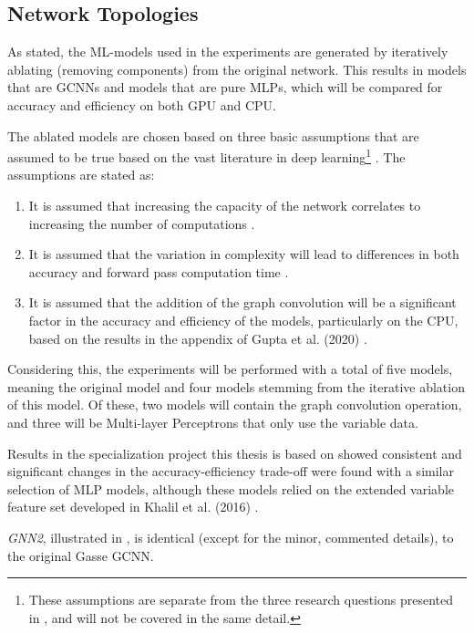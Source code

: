\subsection{Network Topologies}

As stated, the \gls{ML}-models used in the experiments are generated by iteratively ablating (removing components) from the original network. This results in models that are \gls{GCNN}s and models that are pure \gls{MLP}s, which will be compared for accuracy and efficiency on both \gls{GPU} and \gls{CPU}. 

The ablated models are chosen based on three basic assumptions that are assumed to be true based on the vast literature in deep learning\footnote{These assumptions are separate from the three research questions presented in , and will not be covered in the same detail.} \cite{goodfellow2016deep}. The assumptions are stated as: 


\begin{enumerate}[label=(\roman*)]
    \item  It is assumed that increasing the capacity of the network correlates to increasing the number of computations \cite{goodfellow2016deep}. 
    \item  It is assumed that the variation in complexity will lead to differences in both accuracy and forward pass computation time \cite{goodfellow2016deep}. 
    \item  It is  assumed that the addition of the graph convolution will be a significant factor in the accuracy and efficiency of the models, particularly on the \gls{CPU}, based on the results in the appendix of Gupta et al. (2020) \cite{gupta2020hybrid}.
\end{enumerate}

Considering this, the experiments will be performed with a total of five models, meaning the original model and four models stemming from the iterative ablation of this model. Of these, two models will contain the graph convolution operation, and three will be Multi-layer Perceptrons that only use the variable data. 

Results in the specialization project this thesis is based on showed consistent and significant changes in the accuracy-efficiency trade-off were found with a similar selection of \gls{MLP} models, although these models relied on the extended variable feature set developed in Khalil et al. (2016) \cite{khalil2016learning}.

\textit{GNN2}, illustrated in , is identical (except for the minor, commented details), to the original Gasse \gls{GCNN}.  

